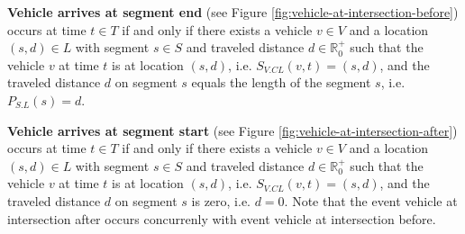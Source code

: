 \documentclass[graybox]{svmult}
\begin{document}


\noindent
\textbf{Vehicle arrives at segment end} (see Figure \ref{fig:vehicle-at-intersection-before})
occurs at time $t \in T$ if and only if there exists a vehicle $v \in V$ and a location $(s,d) \in L$ with segment $s \in S$ and traveled distance $d \in \mathbb{R}_0^+$ such that the vehicle $v$ at time $t$ is at location $(s,d)$, i.e. $S_{V.CL}(v,t) = (s,d)$, and the traveled distance $d$ on segment $s$ equals the length of the segment $s$, i.e. $P_{S.L}(s) = d$.

\vspace{4mm}
\noindent
\textbf{Vehicle arrives at segment start} (see Figure \ref{fig:vehicle-at-intersection-after})
occurs at time $t \in T$ if and only if there exists a vehicle $v \in V$ and a location $(s,d) \in L$ with segment $s \in S$ and traveled distance $d \in \mathbb{R}_0^+$ such that the vehicle $v$ at time $t$ is at location $(s,d)$, i.e. $S_{V.CL}(v,t) = (s,d)$, and the traveled distance $d$ on segment $s$ is zero, i.e. $d = 0$. Note that the event vehicle at intersection after occurs concurrenly with event vehicle at intersection before.
\end{document}
